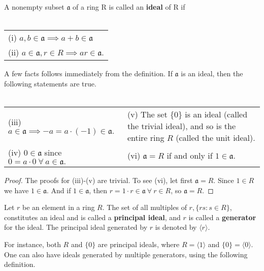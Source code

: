 \documentclass[english,bachelor]{liumaiex}
\begin{document}
\begin{define}
A nonempty subset $\mathfrak{a}$ of a ring R is called an \textbf{ideal} of R if \\ \\
\begin{tabular}{l}
(i) $a,b \in \mathfrak{a} \implies a+b \in \mathfrak{a}$ \\
(ii) $a \in \mathfrak{a}, r \in R \implies ar \in \mathfrak{a}.$
\end{tabular}
\end{define}
A few facts follows immediately from the definition. If $\mathfrak{a}$ is an ideal, then the following statements are true.\\ \\
\begin{tabular}{l p{6.5cm}}
(iii) $a \in \mathfrak{a} \implies -a=a\cdot(-1) \in \mathfrak{a}.$ & (v) The set $\{0\}$ is an ideal \newline (called the trivial ideal), and so is the entire ring $R$ (called the unit ideal). \\
(iv) $0 \in \mathfrak{a}$ since $0 = a\cdot 0 \ \forall \ a \in \mathfrak{a}.$ & (vi) $\mathfrak{a} = R$ if and only if $1 \in \mathfrak{a}$.\\
\end{tabular}

\begin{proof}
The proofs for (iii)-(v) are trivial. To see (vi), let first $\mathfrak{a} = R$. Since $1 \in R$ we have $1 \in \mathfrak{a}.$ And if $1 \in \mathfrak{a}$, then $r = 1\cdot r \in \mathfrak{a} \ \forall \ r \in R$, so $\mathfrak{a} = R.$
\end{proof}

\begin{define}
Let $r$ be an element in a ring $R$. The set of all multiples of $r, \{rs : s \in R\}$, constitutes an ideal and is called a \textbf{principal ideal}, and $r$ is called a \textbf{generator} for the ideal. The principal ideal generated by $r$ is denoted by $\langle r \rangle$. 
\end{define}

For instance, both $R$ and $\{0\}$ are principal ideals, where $R = \langle 1 \rangle$ and $\{0\} = \langle 0 \rangle.$ One can also have ideals generated by multiple generators, using the following definition.
\end{document}
